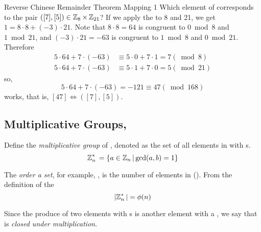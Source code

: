 \begin{example}[]{Reverse Chinese Remainder Theorem Mapping 1}
  Which element of  corresponds to the pair $([7],[5]) \in \operatorname{\mathbb{Z}}_{8} \times \operatorname{\mathbb{Z}}_{21}$?
  \tcblower{}
  If we apply the  to 8 and 21, we get $1 = 8 \cdot 8 + (-3) \cdot 21$.
  Note that $8 \cdot 8 = 64$ is congruent to $0 \bmod 8$ and $1 \bmod 21$, and $(-3) \cdot 21 = -63$ is congruent to $1 \bmod 8$ and $0 \bmod 21$.
  Therefore
  \begin{align*}
    5 \cdot 64+7 \cdot (-63) &\equiv 5 \cdot 0+7 \cdot 1 = 7 (\bmod 8) \\
    5 \cdot 64+7 \cdot (-63) &\equiv 5 \cdot 1+7 \cdot 0 = 5 (\bmod 21)
  \end{align*}
  so,
  \begin{equation*}
    5 \cdot 64 + 7 \cdot (-63) = -121 \equiv 47 (\bmod 168)
  \end{equation*}
  works, that is, $[47] \Leftrightarrow ([7],[5])$.
\end{example}

\subsection{\texorpdfstring{Multiplicative Groups, \TextMultiplicativeGroupN{}}{Multiplicative Groups}}\label{Multiplicative_Groups}
\begin{definition}\label{def:Multiplicative_Group}
  Define the \emph{multiplicative group} of \TextIntsModN{}, denoted \TextMultiplicativeGroupN{} as the set of all elements in \TextIntsModN{} with s.
  \begin{equation}\label{eq:Multiplicative_Group}
    \operatorname{\mathbb{Z}}_{n}^{*}{} = \lbrace a \in \operatorname{\mathbb{Z}}_{n}{} \vert \gcd(a, b) = 1 \rbrace
  \end{equation}
\end{definition}

\begin{definition}\label{def:Set_Order}
  The \emph{order a set}, for example, \TextMultiplicativeGroupN{}, is the number of elements in \TextMultiplicativeGroupN{} (\TextSetOrder{\MultiplicativeGroupN{}}).
  From the definition of the 
  \begin{equation}\label{eq:Set_Order_Euler_Phi_Function}
    \lvert \operatorname{\mathbb{Z}}_{n}^{*}{} \rvert = \phi(n)
  \end{equation}

  \begin{remark}\label{rmk:Set_Order_Closed_Multiplication}
    Since the produce of two elements with s is another element with a , we say that \TextSetOrder{\MultiplicativeGroupN{}} is \emph{closed under multiplication}.
  \end{remark}
\end{definition}

